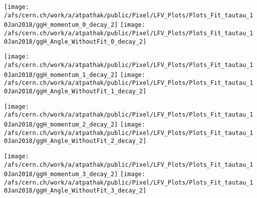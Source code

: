 \documentclass{beamer}
\begin{document}
\begin{frame}
\begin{normalsize}
\begin{center}
\texttt{[image: /afs/cern.ch/work/a/atpathak/public/Pixel/LFV\_Plots/Plots\_Fit\_tautau\_10Jan2018/ggH\_momentum\_0\_decay\_2]}
\texttt{[image: /afs/cern.ch/work/a/atpathak/public/Pixel/LFV\_Plots/Plots\_Fit\_tautau\_10Jan2018/ggH\_Angle\_WithoutFit\_0\_decay\_2]} 
\end{center}
\end{normalsize}
\end {frame}
\begin{frame}
\begin{normalsize}
\begin{center}
\texttt{[image: /afs/cern.ch/work/a/atpathak/public/Pixel/LFV\_Plots/Plots\_Fit\_tautau\_10Jan2018/ggH\_momentum\_1\_decay\_2]}
\texttt{[image: /afs/cern.ch/work/a/atpathak/public/Pixel/LFV\_Plots/Plots\_Fit\_tautau\_10Jan2018/ggH\_Angle\_WithoutFit\_1\_decay\_2]} 
\end{center}
\end{normalsize}
\end {frame}
\begin{frame}
\begin{normalsize}
\begin{center}
\texttt{[image: /afs/cern.ch/work/a/atpathak/public/Pixel/LFV\_Plots/Plots\_Fit\_tautau\_10Jan2018/ggH\_momentum\_2\_decay\_2]}
\texttt{[image: /afs/cern.ch/work/a/atpathak/public/Pixel/LFV\_Plots/Plots\_Fit\_tautau\_10Jan2018/ggH\_Angle\_WithoutFit\_2\_decay\_2]} 
\end{center}
\end{normalsize}
\end {frame}
\begin{frame}
\begin{normalsize}
\begin{center}
\texttt{[image: /afs/cern.ch/work/a/atpathak/public/Pixel/LFV\_Plots/Plots\_Fit\_tautau\_10Jan2018/ggH\_momentum\_3\_decay\_2]}
\texttt{[image: /afs/cern.ch/work/a/atpathak/public/Pixel/LFV\_Plots/Plots\_Fit\_tautau\_10Jan2018/ggH\_Angle\_WithoutFit\_3\_decay\_2]} 
\end{center}
\end{normalsize}
\end {frame}
\end{document}
